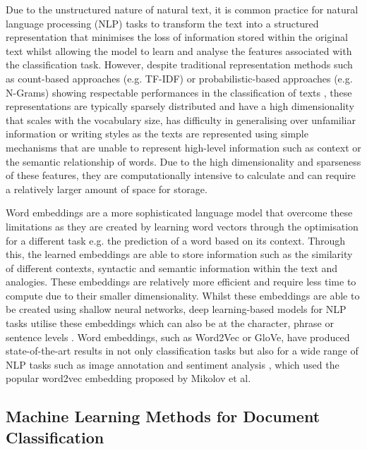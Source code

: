 \documentclass[a4paper,twoside,phd]{BYUPhys}
\begin{document}
Due to the unstructured nature of natural text, it is common practice for natural language processing (NLP) tasks to transform the text into a structured representation that minimises the loss of information stored within the original text whilst allowing the model to learn and analyse the features associated with the classification task. However, despite traditional representation methods such as count-based approaches (e.g. TF-IDF) or probabilistic-based approaches (e.g. N-Grams) showing respectable performances in the classification of texts \cite{Zhang} \cite{Zhou2015}, these representations are typically sparsely distributed and have a high dimensionality that scales with the vocabulary size, has difficulty in generalising over unfamiliar information or writing styles \cite{Rosenfeld2000} as the texts are represented using simple mechanisms that are unable to represent high-level information such as context or the semantic relationship of words. Due to the high dimensionality and sparseness of these features, they are computationally intensive to calculate and can require a relatively larger amount of space for storage.\newline

Word embeddings are a more sophisticated language model that overcome these limitations as they are created by learning word vectors through the optimisation for a different task e.g. the prediction of a word based on its context. Through this, the learned embeddings are able to store information such as the similarity of different contexts, syntactic and semantic information within the text and analogies. These embeddings are relatively more efficient and require less time to compute due to their smaller dimensionality. Whilst these embeddings are able to be created using shallow neural networks, deep learning-based models for NLP tasks utilise these embeddings which can also be at the character, phrase or sentence levels \cite{Young}. Word embeddings, such as Word2Vec or GloVe, have produced state-of-the-art results in not only classification tasks \cite{Howard2018} but also for a wide range of NLP tasks such as image annotation \cite{Weston} and sentiment analysis \cite{Cambria2017}, which used the popular word2vec embedding proposed by Mikolov et al. \cite{Mikolov}


\subsection{Machine Learning Methods for Document Classification}
\label{MLDocumentClassificaiton}
\end{document}
